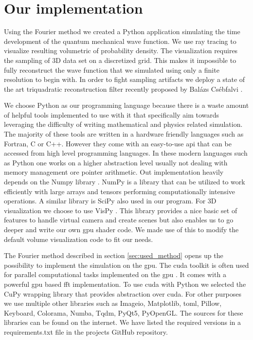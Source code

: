 \section{Our implementation}
\label{sec:our_implementation}

Using the Fourier method we created a Python application simulating the time development of the quantum mechanical wave function.
We use ray tracing to visualize resulting volumetric of probability density.
The visualization requires the sampling of 3D data set on a discretized grid.
This makes it impossible to fully reconstruct the wave function that we simulated using only a finite resolution to begin with.
In order to fight sampling artifacts we deploy a state of the art triquadratic reconstruction filter recently proposed by Balázs Csébfalvi \cite{csebfalvi2023}.

We choose Python \cite{van1995python} as our programming language because there is a waste amount of helpful tools implemented to use with it that specifically aim towards leveraging the difficulty of writing mathematical and physics related simulation.
The majority of these tools are written in a hardware friendly languages such as Fortran, C or C++.
However they come with an easy-to-use \acrfull{api} that can be accessed from high level programming languages.
In these modern languages such as Python one works on a higher abstraction level usually not dealing with memory management ore pointer arithmetic.
Out implementation heavily depends on the Numpy library \cite{harris2020array}.
NumPy is a library that can be utilized to work efficiently with large arrays and tensors performing computationally intensive operations.
A similar library is SciPy \cite{2020SciPy-NMeth} also used in our program.
For 3D visualization we choose to use VisPy \cite{vispy}.
This library provides a nice basic set of features to handle virtual camera and create scenes but also enables us to go deeper and write our own \acrshort{gpu} shader code.
We made use of this to modify the default volume visualization code to fit our needs.

The Fourier method described in section \ref{sec:used_method} opens up the possibility to implement the simulation on the \acrshort{gpu}.
The \acrfull{cuda} toolkit is often used for parallel computational tasks implemented on the \acrshort{gpu} \cite{cuda2008}.
It comes with a powerful \acrshort{gpu} based \acrshort{fft} implementation.
To use \acrshort{cuda} with Python we selected the CuPy wrapping library \cite{cupy_learningsys2017} that provides abstraction over \acrshort{cuda}.
For other purposes we use multiple other libraries such as Imageio, Matplotlib, toml, Pillow, Keyboard, Colorama, Numba, Tqdm, PyQt5, PyOpenGL.
The sources for these libraries can be found on the internet.
We have listed the required versions in a requirements.txt file in the projects GitHub repository.

